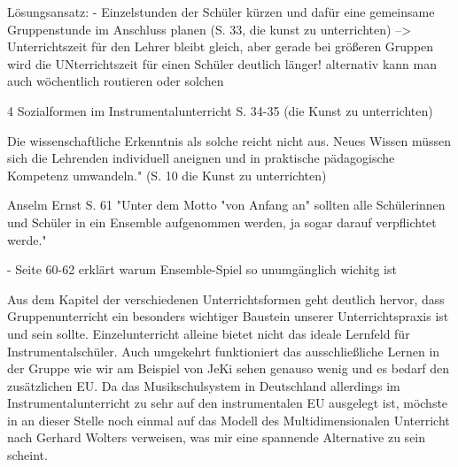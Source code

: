 Lösungsansatz:
- Einzelstunden der Schüler kürzen und dafür eine gemeinsame Gruppenstunde im
Anschluss planen (S. 33, die kunst zu unterrichten)
--> Unterrichtszeit für den Lehrer bleibt gleich, aber gerade bei größeren
Gruppen wird die UNterrichtszeit für einen Schüler deutlich länger!
    alternativ kann man auch wöchentlich routieren oder solchen


4 Sozialformen im Instrumentalunterricht S. 34-35    (die Kunst zu unterrichten)

Die wissenschaftliche Erkenntnis als solche reicht nicht aus. Neues Wissen
müssen sich die Lehrenden individuell aneignen und in praktische pädagogische
Kompetenz umwandeln." (S. 10 die Kunst zu unterrichten)

Anselm Ernst S. 61 "Unter dem Motto "von Anfang an" sollten alle Schülerinnen und
Schüler in ein Ensemble aufgenommen werden, ja sogar darauf verpflichtet werde."

- Seite 60-62 erklärt warum Ensemble-Spiel so unumgänglich wichitg ist

Aus dem Kapitel der verschiedenen Unterrichtsformen geht deutlich hervor, dass
Gruppenunterricht ein besonders wichtiger Baustein unserer Unterrichtspraxis
ist und sein sollte. Einzelunterricht alleine bietet nicht das ideale Lernfeld
für Instrumentalschüler. Auch umgekehrt funktioniert das ausschließliche Lernen
in der Gruppe wie wir am Beispiel von JeKi sehen genauso wenig und es bedarf den
zusätzlichen EU. Da das Musikschulsystem in Deutschland allerdings im
Instrumentalunterricht zu sehr auf den instrumentalen EU ausgelegt ist, möchste
in an dieser Stelle noch einmal auf das Modell des Multidimensionalen Unterricht
nach Gerhard Wolters verweisen, was mir eine spannende Alternative zu sein
scheint. 
